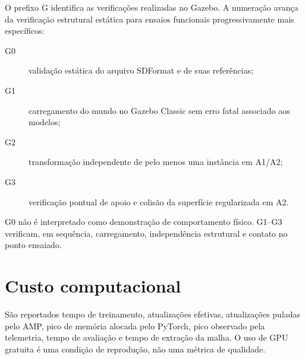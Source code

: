 O prefixo G identifica as verificações realizadas no Gazebo. A numeração avança da verificação estrutural estática para ensaios funcionais progressivamente mais específicos:
\begin{description}
  \item[G0] validação estática do arquivo SDFormat e de suas referências;
  \item[G1] carregamento do mundo no Gazebo Classic sem erro fatal associado aos modelos;
  \item[G2] transformação independente de pelo menos uma instância em A1/A2;
  \item[G3] verificação pontual de apoio e colisão da superfície regularizada em A2.
\end{description}

G0 não é interpretado como demonstração de comportamento físico. G1--G3 verificam, em sequência, carregamento, independência estrutural e contato no ponto ensaiado.

\section{Custo computacional}

São reportados tempo de treinamento, atualizações efetivas, atualizações puladas pelo AMP, pico de memória alocada pelo PyTorch, pico observado pela telemetria, tempo de avaliação e tempo de extração da malha. O uso de GPU gratuita é uma condição de reprodução, não uma métrica de qualidade.
